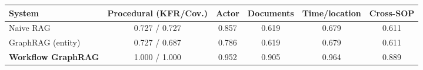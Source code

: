 \begin{tabular}{lccccc}
\toprule
System & Procedural (KFR/Cov.) & Actor & Documents & Time/location & Cross-SOP \\
\midrule
Naive RAG & 0.727 / 0.727 & 0.857 & 0.619 & 0.679 & 0.611 \\
GraphRAG (entity) & 0.727 / 0.687 & 0.786 & 0.619 & 0.679 & 0.611 \\
\textbf{Workflow GraphRAG} & 1.000 / 1.000 & 0.952 & 0.905 & 0.964 & 0.889 \\
\bottomrule
\end{tabular}
